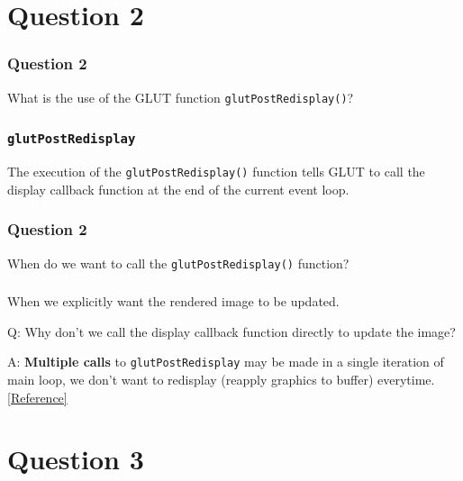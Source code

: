 \documentclass{beamer}
\begin{document}
\section{Question 2}

\begin{frame}
    \frametitle{Question 2}

    What is the use of the GLUT function \texttt{glutPostRedisplay()}?

\end{frame}

\begin{frame}
    \frametitle{\texttt{glutPostRedisplay}}

    The execution of the \texttt{glutPostRedisplay()} function tells GLUT to call the 
    display callback function at the end of the current event loop. \\

\end{frame}

\begin{frame}
    \frametitle{Question 2}

    When do we want to call the \texttt{glutPostRedisplay()} function? 

\end{frame}

\begin{frame}
    \frametitle{}

    When we explicitly want the rendered image to be updated.  

    \vspace{1em}

    \begin{tcolorbox}
        Q: Why don’t we call the display callback function directly to update the image?\\

        \vspace{0.5em}

        A: \textbf{Multiple calls} to \texttt{glutPostRedisplay} may be made in a single iteration of main loop,
        we don't want to redisplay (reapply graphics to buffer) everytime.
        \hyperlink{https://www.opengl.org/resources/libraries/glut/spec3/node20.html}{[Reference]}
    \end{tcolorbox}

\end{frame}

\section{Question 3}
\end{document}
